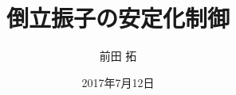 \documentclass[a4j,11pt,twoside]{jbook}
\begin{document}
\title{倒立振子の安定化制御}
\author{前田 拓}
\date{2017年7月12日}
\maketitle

\tableofcontents
\listoffigures
\listoftables
{}






 



 

 

\end{document}
